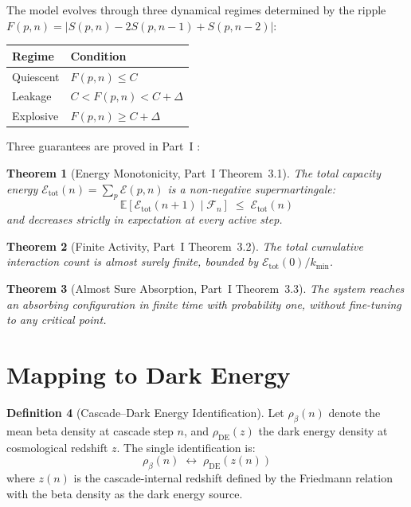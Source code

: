 \documentclass[12pt,a4paper]{article}
\theoremstyle{plain}
\newtheorem{theorem}{Theorem}[section]
\theoremstyle{definition}
\newtheorem{definition}[theorem]{Definition}
\newcommand{\rhoDE}{\rho_{\mathrm{DE}}}
\newcommand{\rhob}{\rho_{\beta}}
\newcommand{\E}{\mathbb{E}}
\begin{document}
The model evolves through three dynamical regimes determined by the ripple
$F(p,n) = |S(p,n) - 2S(p,n-1) + S(p,n-2)|$:

\begin{center}
\begin{tabular}{ll}
\toprule
Regime & Condition \\
\midrule
Quiescent & $F(p,n) \leq C$ \\
Leakage   & $C < F(p,n) < C + \Delta$ \\
Explosive & $F(p,n) \geq C + \Delta$ \\
\bottomrule
\end{tabular}
\end{center}

Three guarantees are proved in Part~I \cite{goswami_part1}:

\begin{theorem}[Energy Monotonicity, Part~I Theorem~3.1]\label{thm:mono}
The total capacity energy $\mathcal{E}_{\mathrm{tot}}(n) = \sum_p \mathcal{E}(p,n)$
is a non-negative supermartingale:
\[
\E[\mathcal{E}_{\mathrm{tot}}(n+1) \mid \mathcal{F}_n] \;\leq\; \mathcal{E}_{\mathrm{tot}}(n)
\]
and decreases strictly in expectation at every active step.
\end{theorem}

\begin{theorem}[Finite Activity, Part~I Theorem~3.2]
The total cumulative interaction count is almost surely finite, bounded by
$\mathcal{E}_{\mathrm{tot}}(0) / k_{\min}$.
\end{theorem}

\begin{theorem}[Almost Sure Absorption, Part~I Theorem~3.3]
The system reaches an absorbing configuration in finite time with probability one,
without fine-tuning to any critical point.
\end{theorem}

\section{Mapping to Dark Energy}
\label{sec:mapping}

\begin{definition}[Cascade--Dark Energy Identification]
Let $\rhob(n)$ denote the mean beta density at cascade step $n$, and
$\rhoDE(z)$ the dark energy density at cosmological redshift $z$. The single
identification is:
\[
\boxed{\rhob(n) \;\longleftrightarrow\; \rhoDE(z(n))}
\]
where $z(n)$ is the cascade-internal redshift defined by the Friedmann relation
with the beta density as the dark energy source.
\end{definition}
\end{document}
